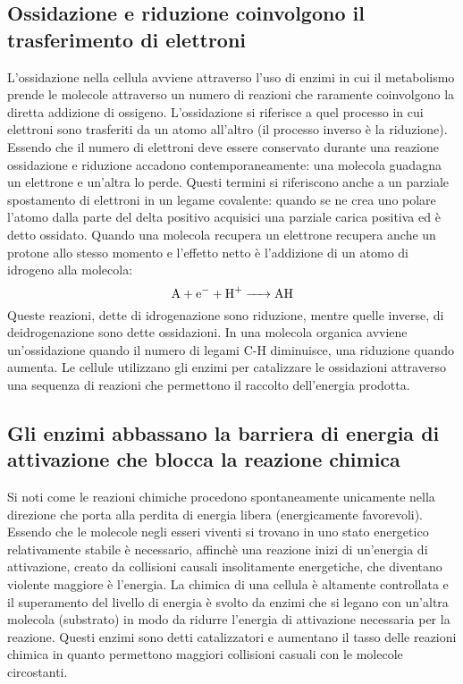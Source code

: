 \subsection{Ossidazione e riduzione coinvolgono il trasferimento di elettroni}
L'ossidazione nella cellula avviene attraverso l'uso di enzimi in cui il metabolismo prende le molecole attraverso un numero di reazioni che raramente coinvolgono la diretta addizione 
di ossigeno. L'ossidazione si riferisce a quel processo in cui elettroni sono trasferiti da un atomo all'altro (il processo inverso \`e la riduzione). Essendo che il numero di elettroni
deve essere conservato durante una reazione ossidazione e riduzione accadono contemporaneamente: una molecola guadagna un elettrone e un'altra lo perde. Questi termini si riferiscono
anche a un parziale spostamento di elettroni in un legame covalente: quando se ne crea uno polare l'atomo dalla parte del delta positivo acquisici una parziale carica positiva ed \`e
detto ossidato. Quando una molecola recupera un elettrone recupera anche un protone allo stesso momento e l'effetto netto \`e l'addizione di un atomo di idrogeno alla molecola:
$$\ce{A + e- + H+ -> AH}$$
Queste reazioni, dette di idrogenazione sono riduzione, mentre quelle inverse, di deidrogenazione sono dette ossidazioni. In una molecola organica avviene un'ossidazione quando il numero
di legami C-H diminuisce, una riduzione quando aumenta. Le cellule utilizzano gli enzimi per catalizzare le ossidazioni attraverso una sequenza di reazioni che permettono il raccolto
dell'energia prodotta. 
\subsection{Gli enzimi abbassano la barriera di energia di attivazione che blocca la reazione chimica}
Si noti come le reazioni chimiche procedono spontaneamente unicamente nella direzione che porta alla perdita di energia libera (energicamente favorevoli). Essendo che le molecole negli
esseri viventi si trovano in uno stato energetico relativamente stabile \`e necessario, affinch\`e una reazione inizi di un'energia di attivazione, creato da collisioni causali
insolitamente energetiche, che diventano violente maggiore \`e l'energia. La chimica di una cellula \`e altamente controllata e il superamento del livello di energia \`e svolto da 
enzimi che si legano con un'altra molecola (substrato) in modo da ridurre l'energia di attivazione necessaria per la reazione. Questi enzimi sono detti catalizzatori e aumentano il 
tasso delle reazioni chimica in quanto permettono maggiori collisioni casuali con le molecole circostanti. 

